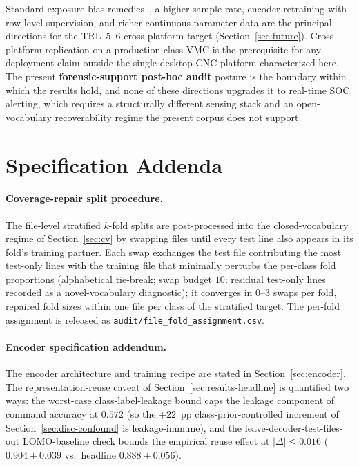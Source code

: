 \documentclass[sensors,article,submit,moreauthors,pdftex]{Definitions/mdpi}
\begin{document}
Standard exposure-bias remedies~\cite{he2019exposure,ott2018uncertainty,ranzato2016sequence,holtzman2020curious,welleck2020neural}, a higher sample rate, encoder retraining with row-level supervision, and richer continuous-parameter data are the principal directions for the TRL~5--6 cross-platform target (Section~\ref{sec:future}). Cross-platform replication on a production-class VMC is the prerequisite for any deployment claim outside the single desktop CNC platform characterized here. The present \textbf{forensic-support post-hoc audit} posture is the boundary within which the results hold, and none of these directions upgrades it to real-time SOC alerting, which requires a structurally different sensing stack and an open-vocabulary recoverability regime the present corpus does not support.

\appendix
\section{Specification Addenda}
\label{app3:addenda}\label{app:spec-addenda}

\paragraph{Coverage-repair split procedure.} The file-level stratified $k$-fold splits are post-processed into the closed-vocabulary regime of Section~\ref{sec:cv} by swapping files until every test line also appears in its fold's training partner. Each swap exchanges the test file contributing the most test-only lines with the training file that minimally perturbs the per-class fold proportions (alphabetical tie-break; swap budget $10$; residual test-only lines recorded as a novel-vocabulary diagnostic); it converges in $0$--$3$ swaps per fold, repaired fold sizes within one file per class of the stratified target. The per-fold assignment is released as \texttt{audit/file\_fold\_assignment.csv}.

\paragraph{Encoder specification addendum.} The encoder architecture and training recipe are stated in Section~\ref{sec:encoder}. The representation-reuse caveat of Section~\ref{sec:results-headline} is quantified two ways: the worst-case class-label-leakage bound caps the leakage component of command accuracy at $0.572$ (so the $+22$~pp class-prior-controlled increment of Section~\ref{sec:disc-confound} is leakage-immune), and the leave-decoder-test-files-out LOMO-baseline check bounds the empirical reuse effect at $|\Delta|\!\le\!0.016$ ($0.904 \pm 0.039$ vs.\ headline $0.888 \pm 0.056$).
\end{document}

